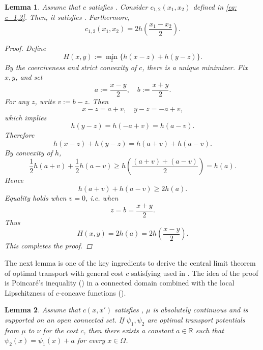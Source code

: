 \documentclass{amsart}
\theoremstyle{plain}
\numberwithin{equation}{section}\newtheorem{theorem}{Theorem}[section]
\newtheorem{lemma}[theorem]{Lemma}
\theoremstyle{remark}
\begin{document}
\begin{lemma}\label{lem: min of c_1 + c_2}
Assume that $c$ satisfies . Consider  $c_{1,2}(x_1, x_2)$ defined in \eqref{eq: c_1,2}. Then, it satisfies . Furthermore, 
\[
    c_{1,2}(x_1, x_2) = 2 h \left( \frac{x_1 - x_2}{2} \right).
\]




\begin{proof}
Define
\[
    H(x,y):=\min_{z}\{h(x-z)+h(y-z)\}.
\]
By the coerciveness and strict convexity of $c$, there is a unique minimizer. Fix $x,y$, and set
\[
    a:=\frac{x-y}{2}, \quad b:=\frac{x+y}{2}.
\]
For any $z$, write $v:=b-z$. Then
\[
    x-z=a+v,
    \quad
    y-z=-a+v, 
\]
which implies
\[
    h(y-z)=h(-a+v)=h(a-v).
\]
Therefore
\[
    h(x-z)+h(y-z)
    =
    h(a+v)+h(a-v).
\]
By convexity of $h$,
\[
    \frac12 h(a+v)+\frac12 h(a-v)
    \geq
    h\left(\frac{(a+v)+(a-v)}{2}\right)
    =
    h(a).
\]
Hence
\[
    h(a+v)+h(a-v)\geq 2h(a).
\]
Equality holds when $v=0$, i.e. when
\[
    z=b=\frac{x+y}{2}.
\]
Thus
\[
    H(x,y)=2h(a)
    =
    2h\left(\frac{x-y}{2}\right).
\]
This completes the proof.
\end{proof}
\end{lemma}







The next lemma is one of the key ingredients to derive the central limit theorem of optimal transport with general cost $c$ satisfying  used in \cite{CLT_general_transport2024}. The idea of the proof is Poincaré’s inequality (\cite[Theorem 3.2]{acosta2004optimal}) in a connected domain combined with the local Lipschitzness of $c$-concave functions (\cite[Theorem 3.3]{gangbo1996geometry}).



\begin{lemma}\cite[Corollary 2.7]{CLT_general_transport2024}\label{lem: uniqueness of potenial}
Assume that $c(x,x')$ satisfies , $\mu$ is absolutely continuous and is supported on an open connected set. If $\psi_1,\psi_2$ are optimal transport potentials from $\mu$ to $\nu$ for the cost $c$, then there exists a constant $a \in \mathbb{R}$ such that $\psi_2(x)= \psi_1(x) + a$ for every $x \in \Omega$.    
\end{lemma}
\end{document}
